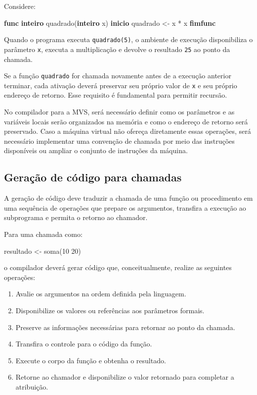 \documentclass[
  brazilian,
  letterpaper,
]{book}
\newenvironment{Shaded}{\begin{snugshade}}{\end{snugshade}}
\newcommand{\DecValTok}[1]{\textcolor[rgb]{0.68,0.00,0.00}{#1}}
\newcommand{\KeywordTok}[1]{\textcolor[rgb]{0.00,0.23,0.31}{\textbf{#1}}}
\newcommand{\NormalTok}[1]{\textcolor[rgb]{0.00,0.23,0.31}{#1}}
\providecommand{\tightlist}{%
  \setlength{\itemsep}{0pt}\setlength{\parskip}{0pt}}
\theoremstyle{plain}
\theoremstyle{definition}
\theoremstyle{remark}
\begin{document}
Considere:

\begin{Shaded}
\begin{Highlighting}[]
\KeywordTok{func} \KeywordTok{inteiro}\NormalTok{ quadrado(}\KeywordTok{inteiro}\NormalTok{ x)}
\KeywordTok{inicio}
\NormalTok{    quadrado \textless{}{-} x * x}
\KeywordTok{fimfunc}
\end{Highlighting}
\end{Shaded}

Quando o programa executa \texttt{quadrado(5)}, o ambiente de execução
disponibiliza o parâmetro \texttt{x}, executa a multiplicação e devolve
o resultado \texttt{25} ao ponto da chamada.

Se a função \texttt{quadrado} for chamada novamente antes de a execução
anterior terminar, cada ativação deverá preservar seu próprio valor de
\texttt{x} e seu próprio endereço de retorno. Esse requisito é
fundamental para permitir recursão.

No compilador para a MVS, será necessário definir como os parâmetros e
as variáveis locais serão organizados na memória e como o endereço de
retorno será preservado. Caso a máquina virtual não ofereça diretamente
essas operações, será necessário implementar uma convenção de chamada
por meio das instruções disponíveis ou ampliar o conjunto de instruções
da máquina.

\subsection{Geração de código para
chamadas}\label{gerauxe7uxe3o-de-cuxf3digo-para-chamadas}

A geração de código deve traduzir a chamada de uma função ou
procedimento em uma sequência de operações que prepare os argumentos,
transfira a execução ao subprograma e permita o retorno ao chamador.

Para uma chamada como:

\begin{Shaded}
\begin{Highlighting}[]
\NormalTok{resultado \textless{}{-} soma(}\DecValTok{10} \DecValTok{20}\NormalTok{)}
\end{Highlighting}
\end{Shaded}

o compilador deverá gerar código que, conceitualmente, realize as
seguintes operações:

\begin{enumerate}
\def\labelenumi{\arabic{enumi}.}
\tightlist
\item
  Avalie os argumentos na ordem definida pela linguagem.
\item
  Disponibilize os valores ou referências aos parâmetros formais.
\item
  Preserve as informações necessárias para retornar ao ponto da chamada.
\item
  Transfira o controle para o código da função.
\item
  Execute o corpo da função e obtenha o resultado.
\item
  Retorne ao chamador e disponibilize o valor retornado para completar a
  atribuição.
\end{enumerate}
\end{document}

